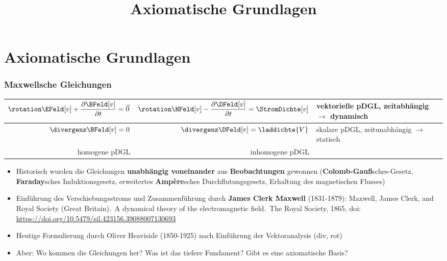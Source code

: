 
\usepackage{tabu}
\usepackage[absolute,overlay]{textpos}

\title[TET: Axiomatische Grundlagen]{Axiomatische Grundlagen}


\maketitle

\section{Axiomatische Grundlagen}

\begin{frame}
  \frametitle{Maxwellsche Gleichungen}
{\tabulinesep=1.2mm
  \begin{tabu}{r|rl}
    \(\rotation\EFeld[v] + \dfrac{\partial \BFeld[v]}{\partial t} = \vec{0} \) & \(\rotation \HFeld[v] -\dfrac{\partial \DFeld[v]}{\partial t} = \StromDichte[v] \) & vektorielle pDGL, zeitabhängig \(\to\) dynamisch \\
\hline
    \( \divergenz\BFeld[v] = 0 \) & \( \divergenz \DFeld[v] =\laddichte{V}\) & skalare pDGL, zeitunabhängig \(\to\) statisch\\
    homogene pDGL & inhomogene pDGL & 
    \end{tabu}}
  
\begin{itemize}[<+->]
\item Historisch wurden die Gleichungen \textbf{unabhängig voneinander} aus \textbf{Beobachtungen} gewonnen (\textbf{Colomb-Gauß}sches-Gesetz, \textbf{Faraday}sches Induktionsgesetz, erweitertes \textbf{Ampère}sches Durchflutungsgesetz, Erhaltung des magnetischen Flusses) 
\item Einführung des Verschiebungsstroms und Zusammenführung durch \textbf{James Clerk Maxwell} (1831-1879): {\tiny Maxwell, James Clerk, and Royal Society (Great Britain). A dynamical theory of the electromagnetic field. The Royal Society, 1865, doi: \url{https://doi.org/10.5479/sil.423156.39088007130693}}
\item Heutige Formulierung durch Oliver Heaviside (1850-1925) nach Einführung der Vektoranalysis (div, rot)
\item Aber: Wo kommen die Gleichungen her? Was ist das tiefere Fundament? Gibt es eine axiomatische Basis?
\end{itemize}
\end{frame}

